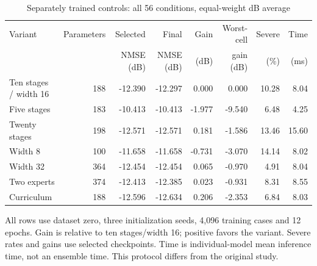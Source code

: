 \begin{table}[!t]
\caption{Separately trained controls: all 56 conditions, equal-weight dB average}
\centering\small\setlength{\tabcolsep}{5pt}
\begin{tabular}{@{}lrrrrrrr@{}}\toprule
Variant & Parameters & Selected & Final & Gain & Worst-cell & Severe & Time\\
 & & NMSE (dB) & NMSE (dB) & (dB) & gain (dB) & (\%) & (ms)\\\midrule
Ten stages / width 16 & 188 & -12.390 & -12.297 & 0.000 & 0.000 & 10.28 & 8.04\\
Five stages & 183 & -10.413 & -10.413 & -1.977 & -9.540 & 6.48 & 4.25\\
Twenty stages & 198 & -12.571 & -12.571 & 0.181 & -1.586 & 13.46 & 15.60\\
Width 8 & 100 & -11.658 & -11.658 & -0.731 & -3.070 & 14.14 & 8.02\\
Width 32 & 364 & -12.454 & -12.454 & 0.065 & -0.970 & 4.91 & 8.04\\
Two experts & 374 & -12.413 & -12.385 & 0.023 & -0.931 & 8.31 & 8.55\\
Curriculum & 188 & -12.596 & -12.634 & 0.206 & -2.353 & 6.84 & 8.03\\
\bottomrule\end{tabular}
\parbox{\textwidth}{\footnotesize All rows use dataset zero, three initialization seeds, 4,096 training cases and 12 epochs.
Gain is relative to ten stages/width 16; positive favors the variant.
Severe rates and gains use selected checkpoints. Time is individual-model mean inference time, not an ensemble time.
This protocol differs from the original study.}
\end{table}
